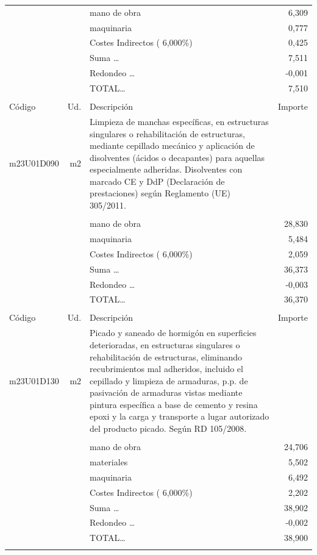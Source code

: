 \documentclass{book}%
\begin{document}
\begin{supertabular}{l r p{60mm} r}
&&mano de obra&     6,309\\%
&&maquinaria&     0,777\\%
&&Costes Indirectos (     6,000\%)&     0,425\\%
&&Suma \ldots&     7,511\\%
&&Redondeo \ldots&    {-}0,001\\%
%
&&TOTAL\ldots&     7,510\\%
&&&\\%
Código&Ud.&Descripción&Importe\\%
\hline%
m23U01D090&m2&Limpieza de manchas específicas, en estructuras singulares o rehabilitación de estructuras, mediante cepillado mecánico y aplicación de disolventes (ácidos o decapantes) para aquellas especialmente adheridas. Disolventes con marcado CE y DdP (Declaración de prestaciones) según Reglamento (UE) 305/2011.&\\%
&&&\\%
&&mano de obra&    28,830\\%
&&maquinaria&     5,484\\%
&&Costes Indirectos (     6,000\%)&     2,059\\%
&&Suma \ldots&    36,373\\%
&&Redondeo \ldots&    {-}0,003\\%
%
&&TOTAL\ldots&    36,370\\%
&&&\\%
Código&Ud.&Descripción&Importe\\%
\hline%
m23U01D130&m2&Picado y saneado de hormigón en superficies deterioradas, en estructuras singulares o rehabilitación de estructuras, eliminando recubrimientos mal adheridos, incluido el cepillado y limpieza de armaduras, p.p. de pasivación de armaduras vistas mediante pintura específica a base de cemento y resina epoxi y la carga y transporte a lugar autorizado del producto picado. Según RD 105/2008.&\\%
&&&\\%
&&mano de obra&    24,706\\%
&&materiales&     5,502\\%
&&maquinaria&     6,492\\%
&&Costes Indirectos (     6,000\%)&     2,202\\%
&&Suma \ldots&    38,902\\%
&&Redondeo \ldots&    {-}0,002\\%
%
&&TOTAL\ldots&    38,900\\%
&&&\\%

\end{supertabular}
\end{document}
